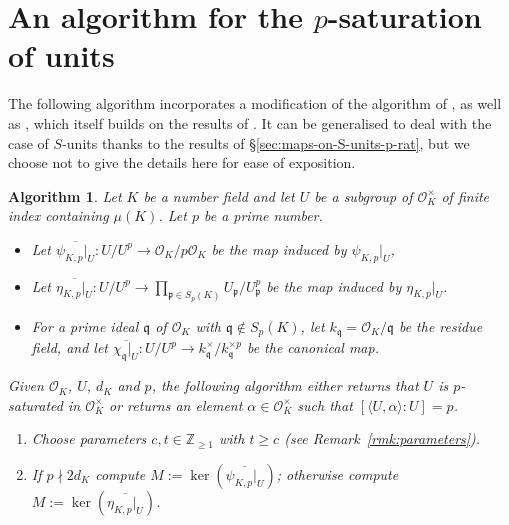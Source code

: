 \documentclass[12pt, a4paper, usenames]{amsart}
\renewcommand{\theenumi}{\alph{enumi}}
\newcommand{\Z}{\mathbb{Z}}
\theoremstyle{plain}
\newtheorem{algorithm}[theorem]{Algorithm}
\theoremstyle{remark}
\theoremstyle{definition}
\begin{document}
\section{An algorithm for the $p$-saturation of units}\label{sec:algs-p-sat-units}

The following algorithm incorporates a modification of the algorithm of
\cite[\S 6]{zbMATH07854947}, as well as \cite[Algorithm~4.9]{MR4440537}, 
which itself builds on the results of \cite{MR498486, MR1273458,MR3207410}.
It can be generalised to deal with the case of $S$-units thanks to the results
of \S \ref{sec:maps-on-S-units-p-rat}, but we choose not to give the details here
for ease of exposition.

\begin{algorithm}\label{alg:check-saturated-or-extract-roots}
Let $K$ be a number field and let $U$ be a subgroup of $\mathcal{O}_{K}^{\times}$
of finite index containing $\mu(K)$.
Let $p$ be a prime number.
\begin{itemize}
    \item Let $\overline{\psi_{K,p}\vert_{U}} : U/U^{p} \longrightarrow \mathcal{O}_{K}/p\mathcal{O}_{K}$ be the map induced by $\psi_{K,p}\vert_{U}$,
    \item Let $\overline{\eta_{K,p}\vert_{U}} : U/U^{p} \longrightarrow \prod_{\mathfrak{p} \in S_{p}(K)} U_{\mathfrak{p}}/ U_{\mathfrak{p}}^{p}$ be the map induced by $\eta_{K,p}\vert_{U}$.
    \item For a prime ideal $\mathfrak{q}$ of $\mathcal{O}_{K}$ with $\mathfrak{q} \notin S_{p}(K)$, let $k_{\mathfrak{q}} = \mathcal{O}_{K}/\mathfrak{q}$ be the residue field, and 
    let $\overline{\chi_{\mathfrak{q}} \vert_{U}} : U/U^{p} \longrightarrow k_{\mathfrak{q}}^{\times} / k_{\mathfrak{q}}^{\times p}$ be the canonical map.
\end{itemize}
Given $\mathcal{O}_{K}$, $U$, $d_{K}$ and $p$, the following algorithm either returns that 
$U$ is $p$-saturated in $\mathcal{O}_{K}^{\times}$ or returns 
an element $\alpha \in \mathcal{O}_{K}^{\times}$ such that 
$[\langle U, \alpha \rangle : U] = p$.
\renewcommand{\theenumi}{\arabic{enumi}}
\renewcommand{\labelenumi}{(\theenumi)}
\begin{enumerate}
    \item Choose parameters $c,t \in \Z_{\geq 1}$ with $t \geq c$ 
    (see Remark~\ref{rmk:parameters}).
    \item If $p \nmid 2d_{K}$ compute $M:=\ker(\overline{\psi_{K,p}\vert_{U}})$;
    otherwise compute $M:=\ker(\overline{\eta_{K,p}\vert_{U}})$.

\end{enumerate}
\end{algorithm}
\end{document}
